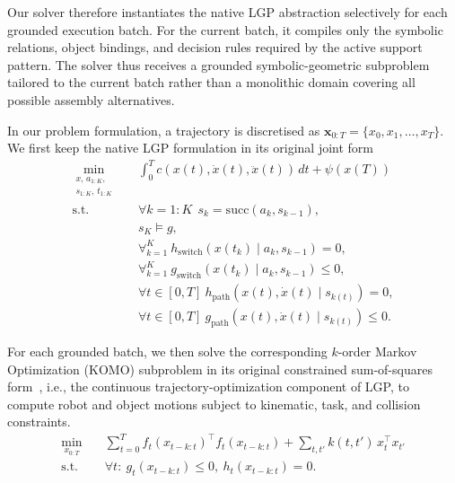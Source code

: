 \documentclass[journal]{IEEEtran}
\begin{document}
Our solver therefore instantiates the native LGP abstraction selectively for
each grounded execution batch. For the current batch, it compiles only the
symbolic relations, object bindings, and decision rules required by the active
support pattern. The solver thus receives a grounded symbolic-geometric
subproblem tailored to the current batch rather than a monolithic domain
covering all possible assembly alternatives.

In our problem formulation, a trajectory is discretised as $\mathbf{x}_{0:T} = \{x_0, x_1, \dots,x_T\}$.
We first keep the native LGP formulation in its original joint form~\cite{cite_lgp_2015}
\begin{align}
\min_{\substack{x,\,a_{1:K},\\ s_{1:K},\,t_{1:K}}}\quad
&\int_0^T c\!\left(x(t),\dot{x}(t),\ddot{x}(t)\right)\,dt + \psi\!\left(x(T)\right)
\label{eq:lgp_joint_objective}\\
\text{s.t.}\quad
&\forall k=1{:}K\ \ s_k = \mathrm{succ}(a_k, s_{k-1}),
\label{eq:lgp_logic_transition}\\
&s_K\models g,
\label{eq:lgp_goal_constraint}\\
&\forall_{k=1}^{K}\ h_{\mathrm{switch}}\!\left(x(t_k)\mid a_k,s_{k-1}\right)=0,
\label{eq:lgp_switch_constraints_eq}\\
&\forall_{k=1}^{K}\ g_{\mathrm{switch}}\!\left(x(t_k)\mid a_k,s_{k-1}\right)\le 0,
\label{eq:lgp_switch_constraints_ineq}\\
&\forall t\in[0,T]\ h_{\mathrm{path}}\!\left(x(t),\dot{x}(t)\mid s_{k(t)}\right)=0,
\label{eq:lgp_path_constraints_eq}\\
&\forall t\in[0,T]\ g_{\mathrm{path}}\!\left(x(t),\dot{x}(t)\mid s_{k(t)}\right)\le 0.
\label{eq:lgp_path_constraints_ineq}
\end{align}

For each grounded batch, we then solve the corresponding $k$-order Markov Optimization (KOMO) subproblem in
its original constrained sum-of-squares form~\cite{cite_komo_2014}, i.e., the continuous trajectory-optimization component of LGP, to compute robot and object motions subject to kinematic, task, and collision constraints.
\begin{align}
\min_{x_{0:T}}\quad
&\sum_{t=0}^{T} f_t\!\left(x_{t-k:t}\right)^\top f_t\!\left(x_{t-k:t}\right)
+\sum_{t,t'} k(t,t')\,x_t^\top x_{t'}
\label{eq:komo_batch}\\
\text{s.t.}\quad
&\forall t:\ g_t\!\left(x_{t-k:t}\right)\le 0,\ h_t\!\left(x_{t-k:t}\right)=0.
\label{eq:komo_batch_constraints}
\end{align}
\end{document}
